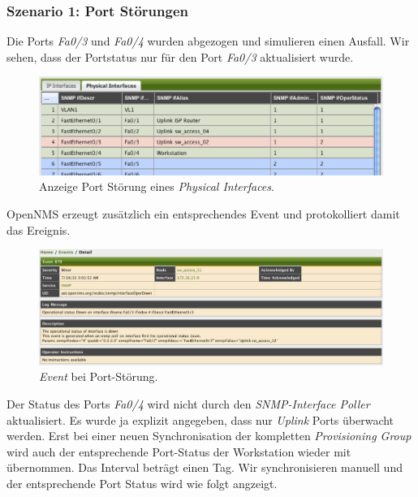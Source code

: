 \subsubsection{Szenario 1: Port Störungen}
Die Ports \emph{Fa0/3} und \emph{Fa0/4} wurden abgezogen und simulieren einen Ausfall. Wir sehen, dass der Portstatus nur für den Port \emph{Fa0/3} aktualisiert wurde.

\begin{figure}[H]
	\centering
	\includegraphics[width=1.0\textwidth]{images/use-cases/monitoring-layer-2/port-outage}
	\caption{Anzeige Port Störung eines \emph{Physical Interfaces}.}
	\label{pic:port-outage-snmpifpoller}
\end{figure}

OpenNMS erzeugt zusätzlich ein entsprechendes Event und protokolliert damit das Ereignis.

\begin{figure}[H]
	\centering
	\includegraphics[width=1.0\textwidth]{images/use-cases/monitoring-layer-2/port-down-event}
	\caption{\emph{Event} bei Port-Störung.}
	\label{pic:port-down-event}
\end{figure}

Der Status des Ports \emph{Fa0/4} wird nicht durch den \emph{SNMP-Interface Poller} aktualisiert. Es wurde ja explizit angegeben, dass nur \emph{Uplink} Ports überwacht werden. Erst bei einer neuen Synchronisation der kompletten \emph{Provisioning Group} wird auch der entsprechende Port-Status der Workstation wieder mit übernommen. Das Interval beträgt einen Tag. Wir synchronisieren manuell und der entsprechende Port Status wird wie folgt angzeigt.

